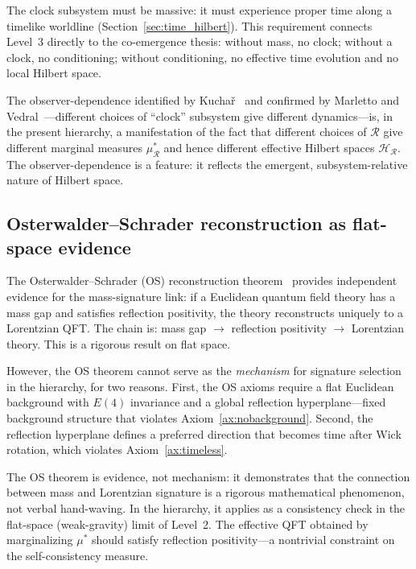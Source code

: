 \documentclass[12pt,a4paper]{article}
\theoremstyle{definition}
\theoremstyle{remark}
\begin{document}
The clock subsystem must be massive: it must experience proper time
along a timelike worldline (Section~\ref{sec:time_hilbert}). This
requirement connects Level~3 directly to the co-emergence thesis:
without mass, no clock; without a clock, no conditioning; without
conditioning, no effective time evolution and no local Hilbert space.

The observer-dependence identified by Kucha\v{r}~\cite{kuchar} and
confirmed by Marletto and Vedral~\cite{marletto_vedral}---different
choices of ``clock'' subsystem give different dynamics---is, in the
present hierarchy, a manifestation of the fact that different choices
of $\mathcal{R}$ give different marginal measures $\mu^*_\mathcal{R}$
and hence different effective Hilbert spaces
$\mathcal{H}_\mathcal{R}$. The observer-dependence is a feature:
it reflects the emergent, subsystem-relative nature of Hilbert space.

\subsection{Osterwalder--Schrader reconstruction as flat-space evidence}

The Osterwalder--Schrader (OS) reconstruction
theorem~\cite{osterwalder_schrader} provides independent evidence for the
mass-signature link: if a Euclidean quantum field theory has a mass gap
and satisfies reflection positivity, the theory reconstructs uniquely to
a Lorentzian QFT. The chain is: mass gap $\to$ reflection positivity
$\to$ Lorentzian theory. This is a rigorous result on flat space.

However, the OS theorem cannot serve as the \emph{mechanism} for
signature selection in the hierarchy, for two reasons. First, the OS
axioms require a flat Euclidean background with $E(4)$ invariance and a
global reflection hyperplane---fixed background structure that violates
Axiom~\ref{ax:nobackground}. Second, the reflection hyperplane defines a
preferred direction that becomes time after Wick rotation, which violates
Axiom~\ref{ax:timeless}.

The OS theorem is evidence, not mechanism: it demonstrates that the
connection between mass and Lorentzian signature is a rigorous
mathematical phenomenon, not verbal hand-waving. In the hierarchy, it
applies as a consistency check in the flat-space (weak-gravity) limit
of Level~2. The effective QFT obtained by marginalizing $\mu^*$ should
satisfy reflection positivity---a nontrivial constraint on the
self-consistency measure.
\end{document}
